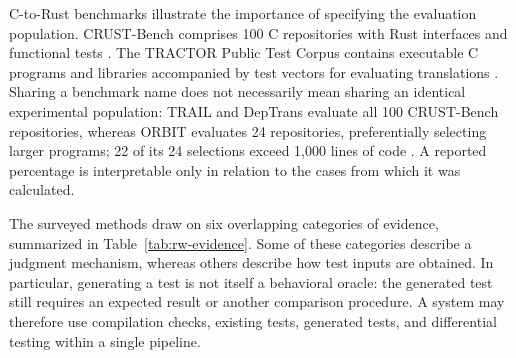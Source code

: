 C-to-Rust benchmarks illustrate the importance of specifying the
evaluation population. CRUST-Bench comprises 100 C repositories with
Rust interfaces and functional tests \cite{khatry2025crustbench}. The
TRACTOR Public Test Corpus contains executable C programs and libraries
accompanied by test vectors for evaluating translations
\cite{tractor-test-corpus}. Sharing a benchmark name does not
necessarily mean sharing an identical experimental population: TRAIL and
DepTrans evaluate all 100 CRUST-Bench repositories, whereas ORBIT
evaluates 24 repositories, preferentially selecting larger programs; 22
of its 24 selections exceed 1,000 lines of code
\cite{wang2026trail,feng2026deptrans,farrukh2026orbit}. A reported
percentage is interpretable only in relation to the cases from which it
was calculated.

The surveyed methods draw on six overlapping categories of evidence,
summarized in Table~\ref{tab:rw-evidence}. Some of these categories describe a judgment
mechanism, whereas others describe how test inputs are obtained. In
particular, generating a test is not itself a behavioral oracle: the
generated test still requires an expected result or another comparison
procedure. A system may therefore use compilation checks, existing
tests, generated tests, and differential testing within a single
pipeline.

